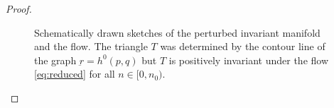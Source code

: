\documentclass[a4paper,11pt]{article}
\numberwithin{step}{dummy}
\begin{document}
\begin{proof}
\begin{figure}[h]
  \centering
   \quad \quad \qquad
    \caption{Schematically drawn sketches of the perturbed invariant manifold and the flow. The triangle $T$ was determined by the contour line of the graph $\underbar{r}=h^0(p,q)$ but $T$ is positively invariant under the flow \eqref{eq:reduced} for all $n \in [0, n_0)$.}
\end{figure}



\end{proof}
\end{document}
